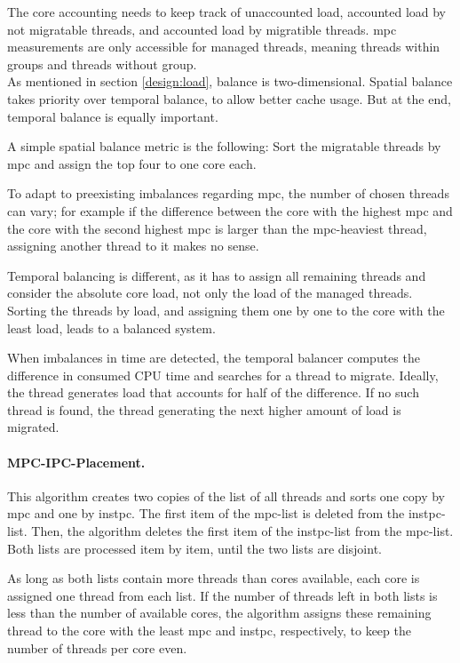 The core accounting needs to keep track of unaccounted load, accounted load by
not migratable threads, and accounted load by migratible threads.
\Gls{mpc} measurements are only accessible for managed threads, meaning
threads within groups and threads without group.
\\

As mentioned in section \ref{design:load}, balance is two-dimensional.
Spatial balance takes priority over temporal balance, to allow better cache usage.
But at the end, temporal balance is equally important.

A simple spatial balance metric is the following: Sort the migratable threads by
\gls{mpc} and assign the top four to one core each.

To adapt to preexisting imbalances regarding \gls{mpc},  the number of chosen
threads can vary; for example if the difference between the core with the
highest \gls{mpc} and the core with the second highest \gls{mpc} is larger than
the \gls{mpc}-heaviest thread, assigning another thread to it makes no sense.

Temporal balancing is different, as it has to assign all remaining threads and
consider the absolute core load, not only the load of the managed threads.
Sorting the threads by load, and assigning them one by one to the
core with the least load, leads to a balanced system.

When imbalances in time are detected, the temporal balancer computes the
difference in consumed CPU time and searches for a thread to migrate.
Ideally, the thread generates load that accounts for half of the difference.
If no such thread is found, the thread generating the next higher amount of
load is migrated.


\paragraph{MPC-IPC-Placement.}
This algorithm creates two copies of the list of all threads and sorts one copy
by \gls{mpc} and one by \gls{instpc}.
The first item of the \gls{mpc}-list is deleted from the
\gls{instpc}-list.
Then, the algorithm deletes the first item of the  \gls{instpc}-list from the
\gls{mpc}-list.
Both lists are processed item by item, until the two lists are disjoint.

As long as both lists contain more threads than cores available, each core
is assigned one thread from each list.
If the number of threads left in both lists is less than the number of
available cores,
the algorithm assigns these remaining thread to the core with the least
\gls{mpc} and \gls{instpc}, respectively, to keep the number of threads per
core even.

